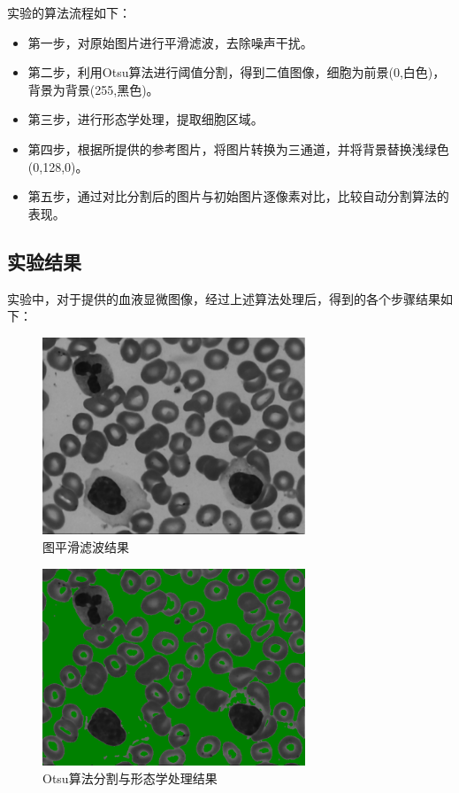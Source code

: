 \documentclass[12pt]{ctexart}
\begin{document}
实验的算法流程如下：
\begin{itemize}
    \item 第一步，对原始图片进行平滑滤波，去除噪声干扰。
    \item 第二步，利用Otsu算法进行阈值分割，得到二值图像，细胞为前景(0,白色)，背景为背景(255,黑色)。
    \item 第三步，进行形态学处理，提取细胞区域。
    \item 第四步，根据所提供的参考图片，将图片转换为三通道，并将背景替换浅绿色(0,128,0)。
    \item 第五步，通过对比分割后的图片与初始图片逐像素对比，比较自动分割算法的表现。
\end{itemize}

\subsection*{实验结果}

实验中，对于提供的血液显微图像，经过上述算法处理后，得到的各个步骤结果如下：

\begin{figure}[H]
    \centering
    \includegraphics[width=0.7\textwidth]{image/gray_smooth.png}
    \caption{图平滑滤波结果}
\end{figure}

\begin{figure}[H]
    \centering
    \includegraphics[width=0.7\textwidth]{image/gray_seg.png}
    \caption{Otsu算法分割与形态学处理结果}
\end{figure}
\end{document}
